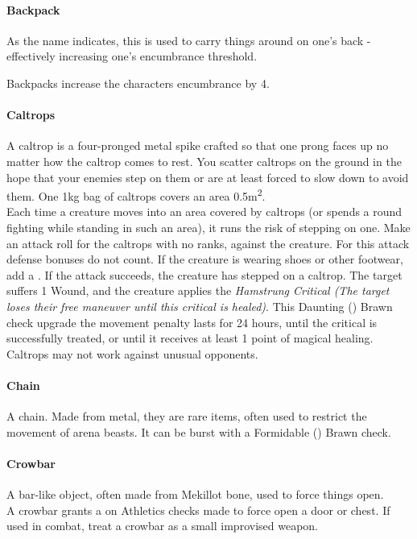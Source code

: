 \begin{multicols}{2}

\paragraph{Backpack} \label{advitm:backpack}
As the name indicates, this is used to carry things around
on one's back - effectively increasing one's encumbrance
threshold.

Backpacks increase the characters encumbrance by 4.

\paragraph{Caltrops} \label{advitm:caltrops}
A caltrop is a four-pronged metal spike crafted so that
one prong faces up no matter how the caltrop comes to
rest. You scatter caltrops on the ground in the hope that
your enemies step on them or are at least forced to slow
down to avoid them. One 1kg bag of caltrops
covers an area 0.5m\textsuperscript{2}.\\
Each time a creature moves into an area covered by
caltrops (or spends a round fighting while standing in
such an area), it runs the risk of stepping on one. Make
an attack roll for the caltrops with no ranks, against the
creature. For this attack defense bonuses do not count. If
the creature is wearing shoes or other footwear, add a
\setback. If the attack succeeds, the creature has stepped on a
caltrop. The target suffers 1 Wound, and the creature
applies the \textit{Hamstrung Critical (The target loses their
free maneuver until this critical is healed)}. This
Daunting (\difficulty\difficulty\difficulty\difficulty)
Brawn check upgrade the
movement penalty lasts for 24 hours, until the critical is
successfully treated, or until it receives at least 1 point
of magical healing.\\
Caltrops may not work against unusual opponents.

\paragraph{Chain} \label{advitm:chain}
A chain. Made from metal, they are rare items, often used to
restrict the movement of arena beasts.
It can be burst with a Formidable
(\difficulty\difficulty\difficulty\difficulty\difficulty)
Brawn check.

\paragraph{Crowbar} \label{advitm:crowbar}
A bar-like object, often made from Mekillot bone, used to
force things open.\\
A crowbar grants a \boost on Athletics checks made to force
open a door or chest. If used in combat, treat a crowbar
as a small improvised weapon.


\end{multicols}

